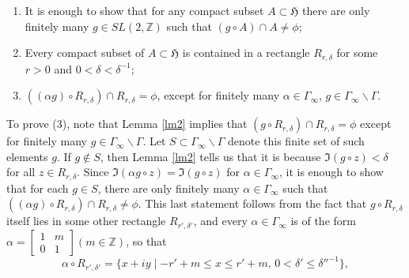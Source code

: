 \begin{enumerate}
  \item It is enough to show that for any compact subset $A \subset \mathfrak{H}$ there are only finitely many $g \in SL(2, \mathbb{Z})$ such that $(g \circ A) \cap A \neq \phi$;

  \item Every compact subset of $A \subset \mathfrak{H}$ is contained in a rectangle $R_{r,\delta}$ for some $r > 0$ and $0 < \delta < \delta^{-1}$;

  \item $((\alpha g) \circ R_{r,\delta}) \cap R_{r,\delta} = \phi$, except for finitely many $\alpha \in \Gamma_{\infty}$, $g \in \Gamma_{\infty}\backslash \Gamma$.
\end{enumerate}

To prove (3), note that Lemma \ref{lm2} implies that $(g \circ R_{r,\delta}) \cap R_{r,\delta} = \phi$ except for finitely many $g \in \Gamma_{\infty}\backslash \Gamma$. Let $S \subset \Gamma_{\infty}\backslash \Gamma$ denote this finite set of such elements $g$. If $g \not\in S$, then Lemma \ref{lm2} tells us that it is because $\Im(g \circ z) < \delta$ for all $z \in R_{r,\delta}$. Since $\Im(\alpha g \circ z) = \Im(g \circ z)$ for $\alpha \in \Gamma_{\infty}$, it is enough to show that for each $g \in S$, there are only finitely many $\alpha \in \Gamma_{\infty}$ such that $((\alpha g) \circ R_{r,\delta}) \cap R_{r,\delta} \neq \phi$. This last statement follows from the fact that $g \circ R_{r,\delta}$ itself lies in some other rectangle $R_{r',\delta'}$, and every $\alpha \in \Gamma_{\infty}$ is of the form $\alpha =
  \begin{bmatrix}
    1 & m \\
    0 & 1
  \end{bmatrix}
  (m \in \mathbb{Z})$, so that
\[
  \alpha \circ R_{r',\delta'} = \{x + iy \mid -r' + m \leq x \leq r' + m, \, 0 < \delta' \leq \delta''^{-1}\},
\]

